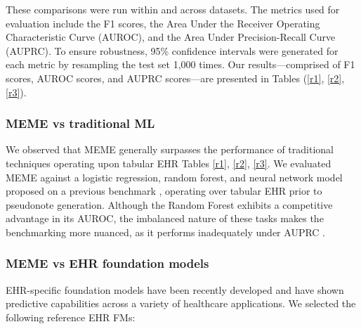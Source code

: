 \documentclass[pmlr]{jmlr}%
\begin{document}
These comparisons were run within and across datasets. The metrics used for evaluation include the F1 scores, the Area Under the Receiver Operating Characteristic Curve (AUROC), and the Area Under Precision-Recall Curve (AUPRC). To ensure robustness, 95\% confidence intervals were generated for each metric by resampling the test set 1,000 times. Our results—comprised of F1 scores, AUROC scores, and AUPRC scores—are presented in Tables (\ref{r1}, \ref{r2},  \ref{r3}).


\subsubsection{MEME vs traditional ML}
We observed that MEME {generally} surpasses the performance of {traditional techniques operating upon tabular EHR {Tables \ref{r1}, \ref{r2}, \ref{r3}}. We evaluated MEME against a logistic regression, random forest, and neural network model proposed on a previous benchmark \citep{xie2022benchmarking}, operating over tabular EHR prior to pseudonote generation.} Although the Random Forest exhibits a competitive advantage in its AUROC, the imbalanced nature of these tasks makes the benchmarking more nuanced, as it performs inadequately under AUPRC \citep{saito2015precision}.

\subsubsection{MEME vs EHR foundation models}

{EHR-specific foundation models have been recently developed and have shown predictive capabilities across a variety of healthcare applications. We selected the following reference EHR FMs:}
\end{document}

